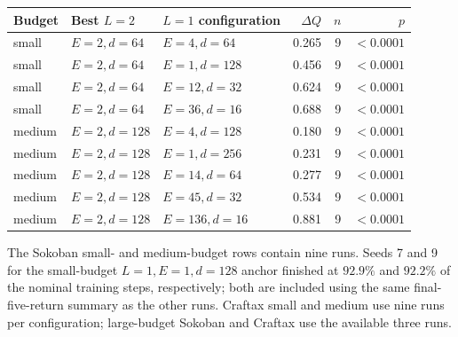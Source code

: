 \documentclass[10pt]{article}
\begin{document}
\setcounter{table}{5}
\begin{center}
\small
\setlength{\tabcolsep}{5.0pt}
\begin{tabular}{@{}lllrrr@{}}
  \toprule
  Budget & Best \(L=2\) & \(L=1\) configuration & \(\Delta Q\) & \(n\) & \(p\) \\
  \midrule
  small & \(E=2,d=64\) & \(E=4,d=64\) & 0.265 & 9 & \(<0.0001\) \\
  small & \(E=2,d=64\) & \(E=1,d=128\) & 0.456 & 9 & \(<0.0001\) \\
  small & \(E=2,d=64\) & \(E=12,d=32\) & 0.624 & 9 & \(<0.0001\) \\
  small & \(E=2,d=64\) & \(E=36,d=16\) & 0.688 & 9 & \(<0.0001\) \\
  medium & \(E=2,d=128\) & \(E=4,d=128\) & 0.180 & 9 & \(<0.0001\) \\
  medium & \(E=2,d=128\) & \(E=1,d=256\) & 0.231 & 9 & \(<0.0001\) \\
  medium & \(E=2,d=128\) & \(E=14,d=64\) & 0.277 & 9 & \(<0.0001\) \\
  medium & \(E=2,d=128\) & \(E=45,d=32\) & 0.534 & 9 & \(<0.0001\) \\
  medium & \(E=2,d=128\) & \(E=136,d=16\) & 0.881 & 9 & \(<0.0001\) \\
  \bottomrule
\end{tabular}
\end{center}
\clearpage

The Sokoban small- and medium-budget rows contain nine runs. Seeds 7 and 9 for
the small-budget \(L=1,E=1,d=128\) anchor finished at \(92.9\%\) and \(92.2\%\)
of the nominal training steps, respectively; both are included using the same
final-five-return summary as the other runs. Craftax small and medium use nine
runs per configuration; large-budget Sokoban and Craftax use the available
three runs.

\setcounter{table}{6}

\clearpage
\end{document}

